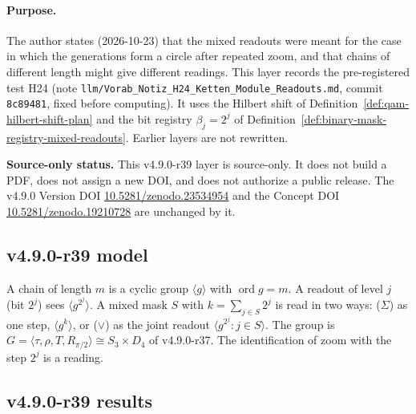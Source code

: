 \paragraph{Purpose.}
The author states (2026-10-23) that the mixed readouts were meant for the case in which the generations form a circle after
repeated zoom, and that chains of different length might give different readings.  This layer records the pre-registered test H24
(note \texttt{llm/Vorab\_Notiz\_H24\_Ketten\_Module\_Readouts.md}, commit \texttt{8c89481}, fixed before computing).  It uses the
Hilbert shift of Definition~\ref{def:qam-hilbert-shift-plan} and the bit registry \(\beta_j=2^j\) of
Definition~\ref{def:binary-mask-registry-mixed-readouts}.  Earlier layers are not rewritten.

\noindent\textbf{Source-only status.}
This v4.9.0-r39 layer is source-only.  It does not build a PDF, does not assign a new DOI,
and does not authorize a public release.  The v4.9.0 Version DOI
\href{https://doi.org/10.5281/zenodo.23534954}{10.5281/zenodo.23534954} and the Concept DOI
\href{https://doi.org/10.5281/zenodo.19210728}{10.5281/zenodo.19210728} are unchanged by it.

\subsection*{v4.9.0-r39 model}
\label{subsec:v490-r39-model}

A chain of length \(m\) is a cyclic group \(\langle g\rangle\) with \(\operatorname{ord}g=m\).  A readout of level \(j\) (bit \(2^j\)) sees
\(\langle g^{2^j}\rangle\).  A mixed mask \(S\) with \(k=\sum_{j\in S}2^j\) is read in two ways: (\(\Sigma\)) as one step,
\(\langle g^k\rangle\), or (\(\vee\)) as the joint readout \(\langle g^{2^j}:j\in S\rangle\).  The group is
\(G=\langle\tau,\rho,T,R_{\pi/2}\rangle\cong S_3\times D_4\) of v4.9.0-r37.  The identification of zoom with the step \(2^j\) is a reading.

\subsection*{v4.9.0-r39 results}
\label{subsec:v490-r39-results}

